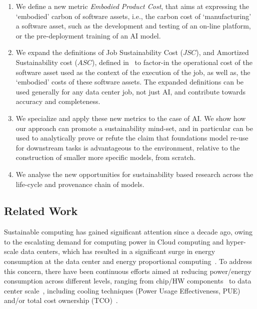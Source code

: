 {    \begin{enumerate}
        \item We define a new metric \textit{Embodied Product Cost}, that aims at expressing the `embodied' carbon of software assets, i.e., the carbon cost of `manufacturing' a software asset, such as the development and testing of an on-line platform, or the pre-deployment training of an AI model.
        \item We expand the definitions of Job Sustainability Cost ($JSC$), and Amortized Sustainability cost ($ASC$), defined in~\cite{Gandhi2022} to factor-in the operational cost of the software asset used as the context of the execution of the job, as well as, the `embodied' costs of these software assets. The expanded definitions can be used generally for any data center job, not just AI, and contribute towards accuracy and completeness.
        \item We specialize and apply these new metrics to the case of AI. We show how our approach can promote a sustainability mind-set, and in particular can be used to analytically prove or refute the claim that foundations model re-use for downstream tasks is advantageous to the environment, relative to the construction of smaller more specific models, from scratch.
        \item We analyse the new opportunities for sustainability based research across the life-cycle and provenance chain of models.
    \end{enumerate}

    \subsection{Related Work}
    {
        Sustainable computing has gained significant attention since a decade ago, owing to the escalating demand for computing power in Cloud computing and hyper-scale data centers, which has resulted in a significant surge in energy consumption at the data center and energy proportional computing~\cite{Barroso2013}. To address this concern, there have been continuous efforts aimed at reducing power/energy consumption across different levels, ranging from chip/HW components~\cite{Jouppi2023,Jiang2020,Capra2020} to data center scale~\cite{Lee2017,Xia2017,Dayarathna2016,Kanagasubaraja2022}, including cooling techniques (Power Usage Effectiveness, PUE) and/or total cost ownership (TCO)~\cite{Zhang2021,Mukherjee2020,Chauhan2019,Rostirolla2022}.

}}
